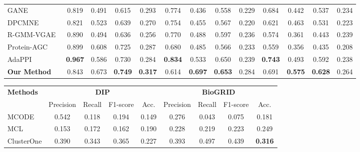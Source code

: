 \begin{table}[t]
{\begin{tabular}{l cccc @{\hspace{8pt}} cccc @{\hspace{8pt}} cccc}
			GANE~\cite{2018embeding}
			& 0.819 & 0.491 & 0.615 & 0.293
			& 0.774 & 0.436 & 0.558 & 0.229
			& 0.684 & 0.442 & 0.537 & 0.234 \\
			
			DPCMNE~\cite{dpcmne2021}
			& 0.821 & 0.523 & 0.639 & 0.270
			& 0.754 & 0.455 & 0.567 & 0.220
			& 0.621 & 0.463 & 0.531 & 0.223 \\
			
			R-GMM-VGAE~\cite{RGMMVGAE2022}
			& 0.890 & 0.494 & 0.636 & 0.256
			& 0.770 & 0.488 & 0.597 & 0.236
			& 0.574 & 0.361 & 0.443 & 0.239 \\
			
			Protein-AGC~\cite{ProteinAGC2019}
			& 0.899 & 0.608 & 0.725 & 0.287
			& 0.680 & 0.485 & 0.566 & 0.233
			& 0.559 & 0.356 & 0.435 & 0.208 \\
			
			AdaPPI~\cite{adappi}
			& \textbf{0.967} & 0.586 & 0.730 & 0.284
			& \textbf{0.834} & 0.533 & 0.650 & 0.239
			& \textbf{0.743} & 0.493 & 0.592 & 0.238 \\
			
			\hline
			\textbf{Our Method}
			& 0.843 & 0.673 & \textbf{0.749} & \textbf{0.317}
			& 0.614 & \textbf{0.697} & \textbf{0.653} & 0.284
			& 0.691 & \textbf{0.575} & \textbf{0.628} & 0.264 \\
			\hline
		\end{tabular}%
	}
	\usebox{\firstpanel}
	
	\vspace{4mm}
	
	\setlength{\tabcolsep}{4pt}
	\begin{tabular*}{0.8\textwidth}{@{\extracolsep{\fill}}l cccc cccc@{}}
		\hline
		\textbf{Methods}
		& \multicolumn{4}{c}{\textbf{DIP}}
		& \multicolumn{4}{c}{\textbf{BioGRID}} \\
		\cline{2-5}
		\cline{6-9}
		& Precision & Recall & F1-score & Acc.
		& Precision & Recall & F1-score & Acc. \\
		\hline
		MCODE
		& 0.542 & 0.118 & 0.194 & 0.149
		& 0.276 & 0.043 & 0.075 & 0.181 \\
		
		MCL
		& 0.153 & 0.172 & 0.162 & 0.190
		& 0.228 & 0.219 & 0.223 & 0.249 \\
		
		ClusterOne
		& 0.390 & 0.343 & 0.365 & 0.227
		& 0.393 & 0.497 & 0.439 & \textbf{0.316} \\
		

\end{tabular*}
\end{table}
